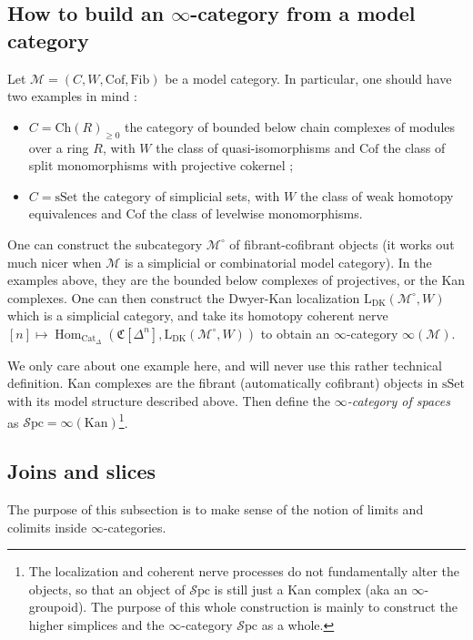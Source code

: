 \documentclass[11pt]{article}
\theoremstyle{definition}
\newcommand{\sSet}{\mathrm{sSet}}
\newcommand{\Spc}{\mathcal{S}\mathrm{pc}}
\newcommand{\Cat}{\mathrm{Cat}}
\DeclareMathOperator{\Hom}{Hom}
\newcommand{\Kan}{\mathrm{Kan}}
\newcommand{\M}{\mathscr{M}}
\newcommand{\Cof}{\mathrm{Cof}}
\newcommand{\Fib}{\mathrm{Fib}}
\begin{document}
\subsection{How to build an $\infty$-category from a model category}

Let $\M = (C, W, \Cof, \Fib)$ be a model category. In particular, one should have two examples in mind :
\begin{itemize}
    \item $C = \mathrm{Ch}(R)_{\geqslant 0}$ the category of bounded below chain complexes of modules over a ring $R$, with $W$ the class of quasi-isomorphisms and $\Cof$ the class of split monomorphisms with projective cokernel ;
    \item $C = \sSet$ the category of simplicial sets, with $W$ the class of weak homotopy equivalences and $\Cof$ the class of levelwise monomorphisms.
\end{itemize}

One can construct the subcategory $\M^{\circ}$ of fibrant-cofibrant objects (it works out much nicer when $\M$ is a simplicial or combinatorial model category). In the examples above, they are the bounded below complexes of projectives, or the Kan complexes. One can then construct the Dwyer-Kan localization $\mathrm{L}_{\mathrm{DK}}(\M^{\circ}, W)$ which is a simplicial category, and take its homotopy coherent nerve $[n] \mapsto \Hom_{\Cat_{\Delta}}(\mathfrak{C}[\Delta^n], \mathrm{L}_{\mathrm{DK}}(\M^{\circ}, W))$ to obtain an $\infty$-category $\infty(\M)$.

We only care about one example here, and will never use this rather technical definition. Kan complexes are the fibrant (automatically cofibrant) objects in $\sSet$ with its model structure described above. Then define the \emph{$\infty$-category of spaces} as $\Spc = \infty(\Kan)$\footnote{The localization and coherent nerve processes do not fundamentally alter the objects, so that an object of $\Spc$ is still just a Kan complex (aka an $\infty$-groupoid). The purpose of this whole construction is mainly to construct the higher simplices and the $\infty$-category $\Spc$ as a whole.}.

\subsection{Joins and slices}

The purpose of this subsection is to make sense of the notion of limits and colimits inside $\infty$-categories.
\end{document}

